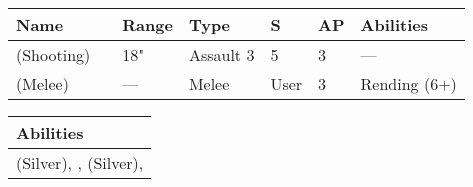 \noindent
\begin{tabular}{||m{110pt} m{30pt} m{31pt} m{55pt} m{12pt} m{12pt} m{210pt}||}
	\hline
	Name & & Range & Type & S & AP & Abilities \\
	\hline
	\quickref{Staff of Light} (Shooting) & & 18" & Assault 3 & 5 & 3 & — \\
	\quickref{Staff of Light} (Melee) & & — & Melee & User & 3 & Rending (6+) \\
	\hline
\end{tabular}

\noindent
\begin{tabular}{||m{532pt}||}
	\hline
	Abilities \\
	\hline
	\quickref{Awakening Protocols}(Silver), \quickref{Living Metal}, \quickref{Nodal Command} (Silver), \quickref{Reanimation Protocols} \\
	\hline
\end{tabular}

\newpage
{}


\newpage
{}

\newpage
{}

\newpage
{}